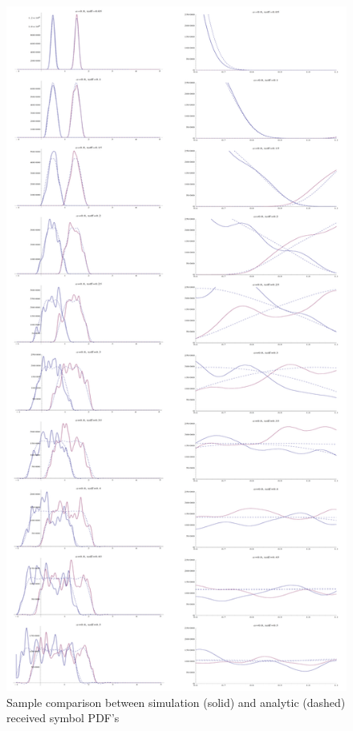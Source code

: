 \begin{figure}[htbp]
\centering
\includegraphics[height=\textheight]{comparison_scaled.png}
\caption[Simulation vs. analytical received symbol PDFs]{Sample comparison between simulation (solid) and analytic
(dashed) received symbol PDF's}
\end{figure}

